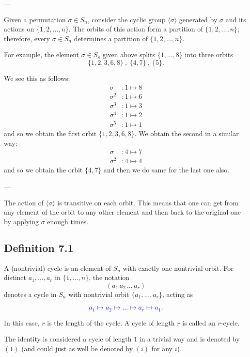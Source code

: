 ---

Given a permutation $\sigma \in S_n$, consider the cyclic group $\langle \sigma \rangle$ generated by $\sigma$ and its actions on $\{1, 2, \dots, n\}$. The orbits of this action form a partition of $\{1, 2, \dots, n\}$; therefore, every $\sigma \in S_n$ determines a partition of $\{1, 2, \dots, n\}$.

For example, the element $\sigma \in S_8$ given above splits $\{1, \dots, 8\}$ into three orbits
$$ \{1, 2, 3, 6, 8\} \ , \ \{4, 7\} \ , \ \{5\} . $$

We see this as follows:
\begin{align*}
\sigma &: 1 \longmapsto 8 \\
\sigma^2 &: 1 \longmapsto 6 \\
\sigma^3 &: 1 \longmapsto 3 \\
\sigma^4 &: 1 \longmapsto 2 \\
\sigma^5 &: 1 \longmapsto 1
\end{align*}
and so we obtain the first orbit $\{1, 2, 3, 6, 8\}$. We obtain the second in a similar way:
\begin{align*}
\sigma &: 4 \longmapsto 7 \\
\sigma^2 &: 4 \longmapsto 4
\end{align*}
and so we obtain the orbit $\{4, 7\}$ and then we do same for the last one also.

---

The action of $\langle \sigma \rangle$ is transitive on each orbit. This means that one can get from any element of the orbit to any other element and then back to the original one by applying $\sigma$ enough times.

\subsection*{Definition 7.1}

{A (nontrivial) cycle is an element of $S_n$ with exactly one nontrivial orbit. For distinct $a_1, \dots, a_r$ in $\{1, \dots, n\}$, the notation
$$ (a_1 \, a_2 \, \dots \, a_r) $$
denotes a cycle in $S_n$ with nontrivial orbit $\{a_1, \dots, a_r\}$, acting as}

\textcolor{blue}{$$ a_1 \longmapsto a_2 \longmapsto \dots \longmapsto a_r \longmapsto a_1 . $$}

In this case, $r$ is the length of the cycle. A cycle of length $r$ is called an $r$-cycle.

The identity is considered a cycle of length $1$ in a trivial way and is denoted by $(1)$ (and could just as well be denoted by $(i)$ for any $i$).

